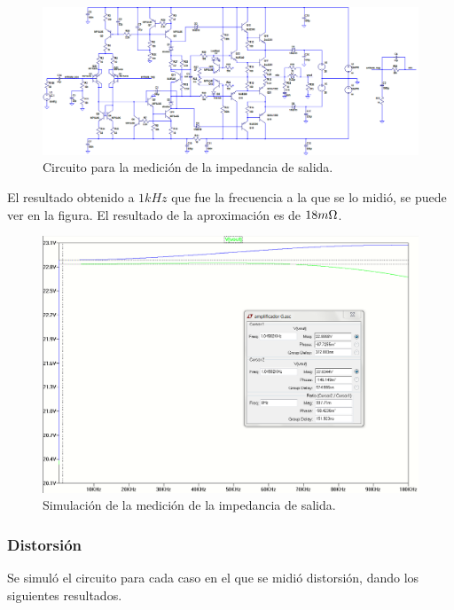 \begin{figure}[H]
\centering
\includegraphics[width=1\textwidth]{img/Rout_circ_2.png}
\caption{Circuito para la medición de la impedancia de salida.}
\label{Rout_med_circ}
\end{figure}

El resultado obtenido a $1kHz$ que fue la frecuencia a la que se lo midió, se puede ver en la figura. El resultado de la aproximación es de $18m\ohm$.

\begin{figure}[H]
\centering
\includegraphics[width=1\textwidth]{img/Rout_2.png}
\caption{Simulación de la medición de la impedancia de salida.}
\label{Rout_med}
\end{figure}

\subsubsection{Distorsión}

Se simuló el circuito para cada caso en el que se midió distorsión, dando los siguientes resultados.

